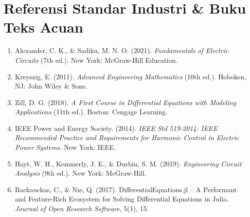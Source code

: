 \documentclass[11pt,a4paper]{article}
\theoremstyle{definition}
\begin{document}
\section{Referensi Standar Industri \& Buku Teks Acuan}
\begin{enumerate}[leftmargin=*]
    \item Alexander, C. K., \& Sadiku, M. N. O. (2021). \textit{Fundamentals of Electric Circuits} (7th ed.). New York: McGraw-Hill Education.
    \item Kreyszig, E. (2011). \textit{Advanced Engineering Mathematics} (10th ed.). Hoboken, NJ: John Wiley \& Sons.
    \item Zill, D. G. (2018). \textit{A First Course in Differential Equations with Modeling Applications} (11th ed.). Boston: Cengage Learning.
    \item IEEE Power and Energy Society. (2014). \textit{IEEE Std 519-2014: IEEE Recommended Practice and Requirements for Harmonic Control in Electric Power Systems}. New York: IEEE.
    \item Hayt, W. H., Kemmerly, J. E., \& Durbin, S. M. (2019). \textit{Engineering Circuit Analysis} (9th ed.). New York: McGraw-Hill.
    \item Rackauckas, C., \& Nie, Q. (2017). DifferentialEquations.jl -- A Performant and Feature-Rich Ecosystem for Solving Differential Equations in Julia. \textit{Journal of Open Research Software}, 5(1), 15.
\end{enumerate}
\end{document}
